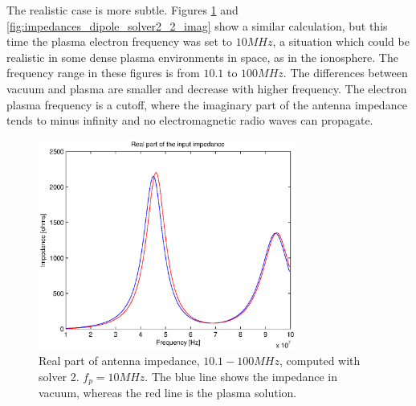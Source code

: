 \documentclass[two-coloumn,ras]{agutex}
\begin{document}
\begin{article}
The realistic case is more subtle. Figures \ref{fig:impedances_dipole_solver2_2_real} and \ref{fig:impedances_dipole_solver2_2_imag} show a similar calculation, but this time the plasma electron frequency was set to $10MHz$, a situation which could be realistic in some dense plasma environments in space, as in the ionosphere. The frequency range in these figures is from $10.1$ to $100MHz$. The differences between vacuum and plasma are smaller and decrease with higher frequency. The electron plasma frequency is a cutoff, where the imaginary part of the antenna impedance tends to minus infinity and no electromagnetic radio waves can propagate.

\begin{figure}
  \noindent\includegraphics[width=20pc]{imps_dipole_solver2_real2.eps}
\caption{Real part of antenna impedance, $10.1 - 100 MHz$, computed with solver 2. $f_p=10MHz$. The blue line shows the impedance in vacuum, whereas the red line is the plasma solution.}
\label{fig:impedances_dipole_solver2_2_real}
\end{figure}


\end{article}
\end{document}
